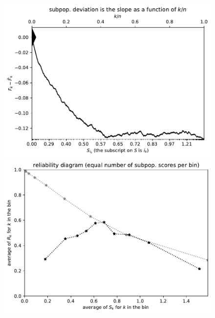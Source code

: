 \documentclass{article}
\begin{document}
\begin{figure}
\begin{centering}

\parbox{\imsize}{\includegraphics[width=\imsize]
{./codes/unweighted/nll-1-68-sidewinder-horned-rattlesnake-Crotalus-cerastes}}
\quad\quad
\parbox{\imsize}{\includegraphics[width=\imsize]
{./codes/unweighted/nll-1-68-sidewinder-horned-rattlesnake-Crotalus-cerastesequisamps10}}

\vspace{\vertsep}


\end{centering}
\end{figure}
\end{document}
